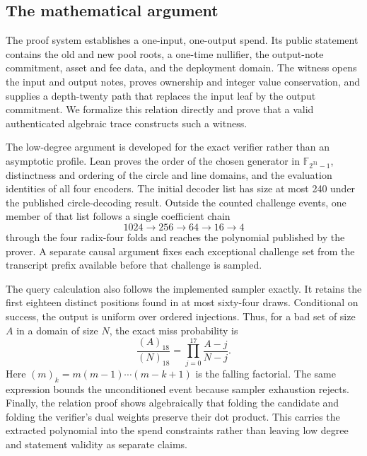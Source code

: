 \subsection{The mathematical argument}

The proof system establishes a one-input, one-output spend.  Its public
statement contains the old and new pool roots, a one-time nullifier, the
output-note commitment, asset and fee data, and the deployment domain.  The
witness opens the input and output notes, proves ownership and integer value
conservation, and supplies a depth-twenty path that replaces the input leaf by
the output commitment.  We formalize this relation directly and prove that a
valid authenticated algebraic trace constructs such a witness.

The low-degree argument is developed for the exact verifier rather than an
asymptotic profile.  Lean proves the order of the chosen generator in
\(\mathbb F_{2^{31}-1}\), distinctness and ordering of the circle and line
domains, and the evaluation identities of all four encoders.  The initial
decoder list has size at most 240 under the published circle-decoding result.
Outside the counted challenge events, one member of that list follows a
single coefficient chain
\[
  1024 \longrightarrow 256 \longrightarrow 64
  \longrightarrow 16 \longrightarrow 4
\]
through the four radix-four folds and reaches the polynomial published by the
prover.  A separate causal argument fixes each exceptional challenge set from
the transcript prefix available before that challenge is sampled.

The query calculation also follows the implemented sampler exactly.  It
retains the first eighteen distinct positions found in at most sixty-four
draws.  Conditional on success, the output is uniform over ordered injections.
Thus, for a bad set of size \(A\) in a domain of size \(N\), the exact miss
probability is
\[
  \frac{(A)_{18}}{(N)_{18}}
  =\prod_{j=0}^{17}\frac{A-j}{N-j}.
\]
Here \((m)_k=m(m-1)\cdots(m-k+1)\) is the falling factorial.
The same expression bounds the unconditioned event because sampler exhaustion
rejects.  Finally, the relation proof shows algebraically that folding the
candidate and folding the verifier's dual weights preserve their dot product.
This carries the extracted polynomial into the spend constraints rather than
leaving low degree and statement validity as separate claims.

